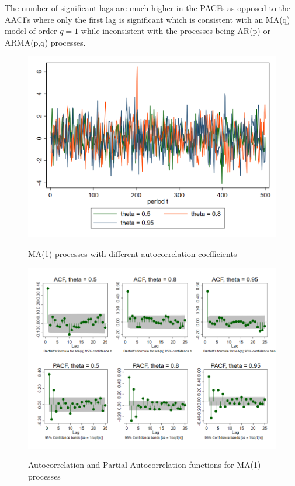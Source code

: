The number of significant lags are much higher in the PACFs as opposed to the AACFs where only the first lag is significant which is consistent with an MA(q) model of order $q=1$ while inconsistent with the processes being AR(p) or ARMA(p,q) processes.
\begin{figure}[H]
  \caption{MA(1) processes with different autocorrelation coefficients}
  \includegraphics[width= \textwidth]{03_figures/fig22c}
  \label{fig:ma1}
  \vspace{-0.1cm}
\end{figure}
\begin{figure}[H]
  \vspace{-1cm}
  \caption{Autocorrelation and Partial Autocorrelation functions for MA(1) processes}
  \includegraphics[width= \textwidth]{03_figures/fig22c_ac}
  \label{fig:ma1_acf}
  \vspace{-1cm}
\end{figure}
